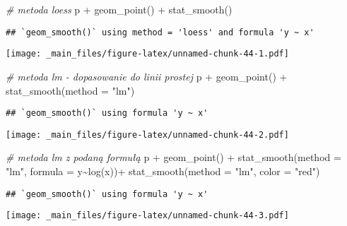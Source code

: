 \documentclass[
]{book}
\newenvironment{Shaded}{\begin{snugshade}}{\end{snugshade}}
\newcommand{\AttributeTok}[1]{\textcolor[rgb]{0.77,0.63,0.00}{#1}}
\newcommand{\CommentTok}[1]{\textcolor[rgb]{0.56,0.35,0.01}{\textit{#1}}}
\newcommand{\FunctionTok}[1]{\textcolor[rgb]{0.00,0.00,0.00}{#1}}
\newcommand{\NormalTok}[1]{#1}
\newcommand{\SpecialCharTok}[1]{\textcolor[rgb]{0.00,0.00,0.00}{#1}}
\newcommand{\StringTok}[1]{\textcolor[rgb]{0.31,0.60,0.02}{#1}}
\begin{document}
\begin{Shaded}
\begin{Highlighting}[]
\CommentTok{\# metoda loess}
\NormalTok{p }\SpecialCharTok{+} \FunctionTok{geom\_point}\NormalTok{() }\SpecialCharTok{+} \FunctionTok{stat\_smooth}\NormalTok{()}
\end{Highlighting}
\end{Shaded}

\begin{verbatim}
## `geom_smooth()` using method = 'loess' and formula 'y ~ x'
\end{verbatim}

\texttt{[image: \_main\_files/figure-latex/unnamed-chunk-44-1.pdf]}

\begin{Shaded}
\begin{Highlighting}[]
\CommentTok{\# metoda lm {-} dopasowanie do linii prostej}
\NormalTok{p }\SpecialCharTok{+} \FunctionTok{geom\_point}\NormalTok{() }\SpecialCharTok{+} \FunctionTok{stat\_smooth}\NormalTok{(}\AttributeTok{method =} \StringTok{"lm"}\NormalTok{)}
\end{Highlighting}
\end{Shaded}

\begin{verbatim}
## `geom_smooth()` using formula 'y ~ x'
\end{verbatim}

\texttt{[image: \_main\_files/figure-latex/unnamed-chunk-44-2.pdf]}

\begin{Shaded}
\begin{Highlighting}[]
\CommentTok{\# metoda lm z podaną formułą}
\NormalTok{p }\SpecialCharTok{+} \FunctionTok{geom\_point}\NormalTok{() }\SpecialCharTok{+} \FunctionTok{stat\_smooth}\NormalTok{(}\AttributeTok{method =} \StringTok{"lm"}\NormalTok{, }\AttributeTok{formula =}\NormalTok{ y}\SpecialCharTok{\textasciitilde{}}\FunctionTok{log}\NormalTok{(x))}\SpecialCharTok{+}
  \FunctionTok{stat\_smooth}\NormalTok{(}\AttributeTok{method =} \StringTok{"lm"}\NormalTok{, }\AttributeTok{color =} \StringTok{"red"}\NormalTok{)}
\end{Highlighting}
\end{Shaded}

\begin{verbatim}
## `geom_smooth()` using formula 'y ~ x'
\end{verbatim}

\texttt{[image: \_main\_files/figure-latex/unnamed-chunk-44-3.pdf]}
\end{document}
